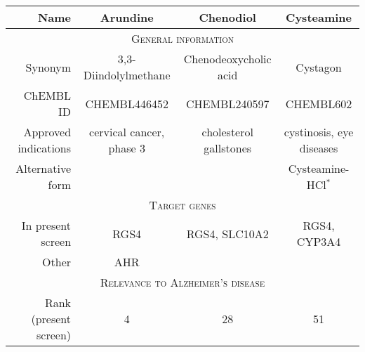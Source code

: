\documentclass[letterpaper]{article}
\begin{document}
\begin{table}
\footnotesize
\begin{tabular}{r|c|c|c}
\toprule
                                              Name &                           Arundine &              Chenodiol &                          Cysteamine \\
\midrule
\multicolumn{4}{c}{\scshape General information} \\
\midrule
                                           Synonym &               3,3-Diindolylmethane &  Chenodeoxycholic acid &                            Cystagon \\
                                         ChEMBL ID &                       CHEMBL446452 &           CHEMBL240597 &                           CHEMBL602 \\
                              Approved indications &          cervical cancer, phase 3 & cholesterol gallstones &            cystinosis, eye diseases \\
                                  Alternative form &                                    &                        & Cysteamine-HCl$^\ast$ \\
\midrule
\multicolumn{4}{c}{\scshape Target genes} \\
\midrule
   In present screen &
   RGS4 &            RGS4, SLC10A2 &                         RGS4, CYP3A4 \\
                                             Other &                                AHR &                        &                                     \\
\midrule
\multicolumn{4}{c}{\scshape Relevance to Alzheimer's disease} \\
\midrule
                                             Rank (present screen)  &                                  4 &                     28 &                                  51 \\

\end{tabular}
\end{table}
\end{document}
